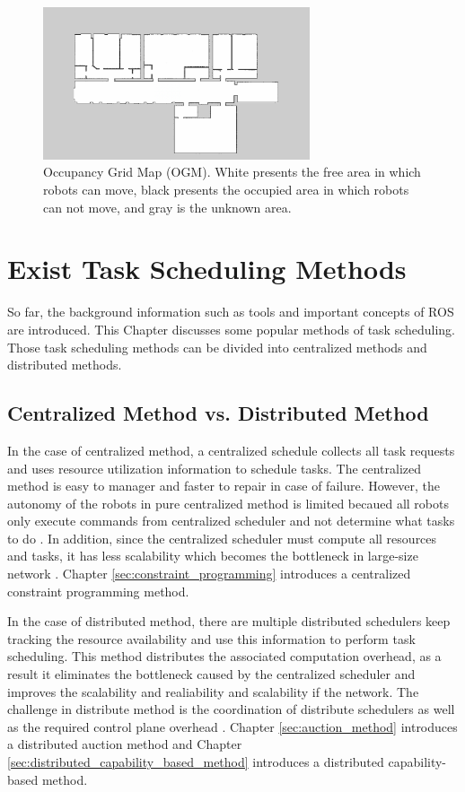\begin{enumerate}
    \begin{figure}[htbp]
        \centering
        \includegraphics[width = 0.7\textwidth]{content/images/ch2/occupancy_grid.png}
        \caption{Occupancy Grid Map (OGM). White presents the free area in which robots can move, black presents the occupied area in which robots can not move, and gray is the unknown area.}
        \label{fig:occupancy_grid}
    \end{figure}
\end{enumerate}


\section{Exist Task Scheduling Methods}
So far, the background information such as tools and important concepts of ROS are introduced. This Chapter discusses some popular methods of task scheduling. Those task scheduling methods can be divided into centralized methods and distributed methods.

\subsection{Centralized Method vs. Distributed Method}
In the case of centralized method, a centralized schedule collects all task requests and uses resource utilization information to schedule tasks. The centralized method is easy to manager and faster to repair in case of failure. However, the autonomy of the robots in pure centralized method is limited becaued all robots only execute commands from centralized scheduler and not determine what tasks to do \cite{NUNES201755}. In addition, since the centralized scheduler must compute all resources and tasks, it has less scalability which becomes the bottleneck in large-size network \cite{CHRISTODOULOPOULOS20091172}.
Chapter \ref{sec:constraint_programming} introduces a centralized constraint programming method. 

In the case of distributed method, there are multiple distributed schedulers keep tracking the resource availability and use this information to perform task scheduling\cite{CHRISTODOULOPOULOS20091172}. This method distributes the associated computation overhead, as a result it eliminates the bottleneck caused by the centralized scheduler and improves the scalability and realiability and scalability if the network. The challenge in distribute method is the coordination of distribute schedulers as well as the required control plane overhead \cite{CHRISTODOULOPOULOS20091172}.
Chapter \ref{sec:auction_method} introduces a distributed auction method and Chapter \ref{sec:distributed_capability_based_method} introduces a distributed capability-based method.

